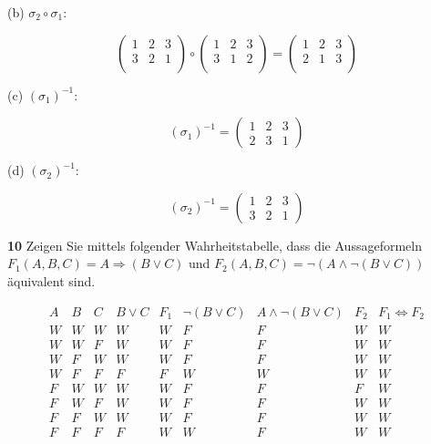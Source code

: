 \documentclass[11pt]{article}
\begin{document}
(b) \(\sigma_{2} \circ \sigma_{1}\):

\[
    \begin{pmatrix}
        1 & 2 & 3 \\
        3 & 2 & 1 \\
    \end{pmatrix}
    \circ
    \begin{pmatrix}
        1 & 2 & 3 \\
        3 & 1 & 2 \\
    \end{pmatrix}
    =
    \begin{pmatrix}
        1 & 2 & 3 \\
        2 & 1 & 3 \\
    \end{pmatrix}
\]

(c) \((\sigma_{1})^{-1}\):

\[
    (\sigma_{1})^{-1} = \begin{pmatrix} 1 & 2 & 3 \\ 2 & 3 & 1 \end{pmatrix}
\]

(d) \((\sigma_{2})^{-1}\):

\[
    (\sigma_{2})^{-1} = \begin{pmatrix} 1 & 2 & 3 \\ 3 & 2 & 1 \end{pmatrix}
\]


\textbf{10} Zeigen Sie mittels folgender Wahrheitstabelle, dass die Aussageformeln \(F_1(A,B,C) = A \Rightarrow (B \lor C)\) und \(F_2(A,B,C) = \neg(A \land \neg(B \lor C))\) äquivalent sind.

\[
    \begin{array}{ccc|c|c|c|c|c|c}
        A & B & C & B \lor C & F_1 & \neg(B \lor C) & A \land \neg(B \lor C) & F_2 & F_1 \Leftrightarrow F_2 \\
        \hline
        W & W & W & W & W & F & F & W & W \\
        W & W & F & W & W & F & F & W & W \\
        W & F & W & W & W & F & F & W & W \\
        W & F & F & F & F & W & W & W & W \\
        F & W & W & W & W & F & F & F & W \\
        F & W & F & W & W & F & F & W & W \\
        F & F & W & W & W & F & F & W & W \\
        F & F & F & F & W & W & F & W & W \\
    \end{array}
\]
\end{document}
